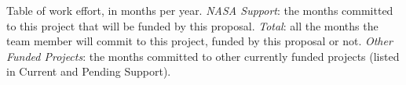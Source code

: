 \def\WorkEffortComments{}     %

\begin{NOTANONworkEffort}
\caption{Table of work effort, in months per year. \emph{NASA Support}: the months committed to this project that will be funded by this proposal. \emph{Total}: all the months the team member will commit to this project, funded by this proposal or not. \emph{Other Funded Projects}: the months committed to other currently funded projects (listed in Current and Pending Support).}
\label{tab:NOTANONworkEffort}
\end{NOTANONworkEffort}
